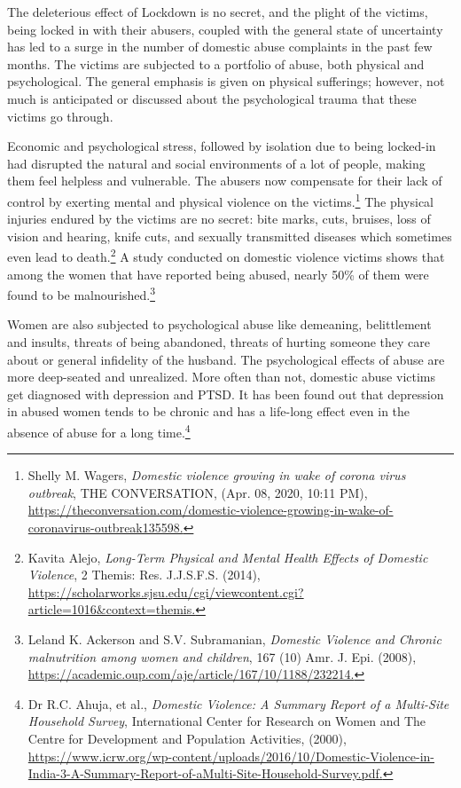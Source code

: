 \begin{multicols}{2}

\noi
The deleterious effect of Lockdown is no secret, and the plight of the victims, being locked in
with their abusers, coupled with the general state of uncertainty has led to a surge in the
number of domestic abuse complaints in the past few months. The victims are subjected to a
portfolio of abuse, both physical and psychological. The general emphasis is given on
physical sufferings; however, not much is anticipated or discussed about the psychological
trauma that these victims go through.

\noi
Economic and psychological stress, followed by isolation due to being locked-in had
disrupted the natural and social environments of a lot of people, making them feel helpless
and vulnerable. The abusers now compensate for their lack of control by exerting mental and
physical violence on the victims.\footnote{Shelly M. Wagers, \textit{Domestic violence growing in wake of corona virus outbreak}, THE CONVERSATION, (Apr.
08, 2020, 10:11 PM), \url{https://theconversation.com/domestic-violence-growing-in-wake-of-coronavirus-outbreak135598.}} The physical injuries endured by the victims are no secret:
bite marks, cuts, bruises, loss of vision and hearing, knife cuts, and sexually transmitted
diseases which sometimes even lead to death.\footnote{Kavita Alejo, \textit{Long-Term Physical and Mental Health Effects of Domestic Violence}, 2 Themis: Res. J.J.S.F.S.
(2014), \url{https://scholarworks.sjsu.edu/cgi/viewcontent.cgi?article=1016\&context=themis.}} A study conducted on domestic violence
victims shows that among the women that have reported being abused, nearly 50\% of them
were found to be malnourished.\footnote{Leland K. Ackerson and S.V. Subramanian, \textit{Domestic Violence and Chronic malnutrition among women and
children}, 167 (10) Amr. J. Epi. (2008), \url{https://academic.oup.com/aje/article/167/10/1188/232214.}}

\noi
Women are also subjected to psychological abuse like demeaning, belittlement and insults,
threats of being abandoned, threats of hurting someone they care about or general infidelity
of the husband. The psychological effects of abuse are more deep-seated and unrealized.
More often than not, domestic abuse victims get diagnosed with depression and PTSD. It has
been found out that depression in abused women tends to be chronic and has a life-long effect
even in the absence of abuse for a long time.\footnote{Dr R.C. Ahuja, et al., \textit{Domestic Violence: A Summary Report of a Multi-Site Household Survey}, International
Center for Research on Women and The Centre for Development and Population Activities, (2000),
\url{https://www.icrw.org/wp-content/uploads/2016/10/Domestic-Violence-in-India-3-A-Summary-Report-of-aMulti-Site-Household-Survey.pdf.}}


\end{multicols}
